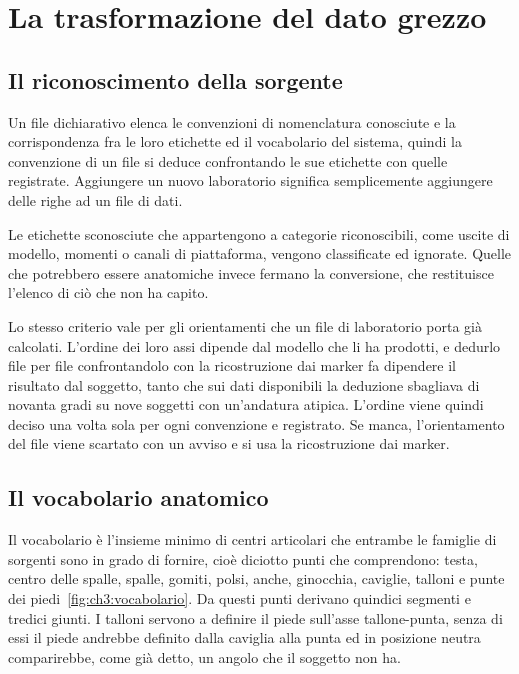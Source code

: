 \section{La trasformazione del dato grezzo}
\label{sec:ch3:trasformazione}

\subsection{Il riconoscimento della sorgente}
\label{subsec:ch3:riconoscimento}

Un file dichiarativo elenca le convenzioni di nomenclatura conosciute e la
corrispondenza fra le loro etichette ed il vocabolario del sistema, quindi la
convenzione di un file si deduce confrontando le sue etichette con quelle
registrate. Aggiungere un nuovo laboratorio significa semplicemente aggiungere
delle righe ad un file di dati.

Le etichette sconosciute che appartengono a categorie riconoscibili, come uscite
di modello, momenti o canali di piattaforma, vengono classificate ed ignorate.
Quelle che potrebbero essere anatomiche invece fermano la conversione, che
restituisce l'elenco di ciò che non ha capito.

Lo stesso criterio vale per gli orientamenti che un file di laboratorio porta già
calcolati. L'ordine dei loro assi dipende dal modello che li ha prodotti, e
dedurlo file per file confrontandolo con la ricostruzione dai marker fa dipendere
il risultato dal soggetto, tanto che sui dati disponibili la deduzione sbagliava
di novanta gradi su nove soggetti con un'andatura atipica. L'ordine viene quindi
deciso una volta sola per ogni convenzione e registrato. Se manca, l'orientamento
del file viene scartato con un avviso e si usa la ricostruzione dai marker.

\subsection{Il vocabolario anatomico}
\label{subsec:ch3:vocabolario}

Il vocabolario è l'insieme minimo di centri articolari che entrambe le famiglie
di sorgenti sono in grado di fornire, cioè diciotto punti che comprendono: testa,
centro delle spalle, spalle, gomiti, polsi, anche, ginocchia, caviglie, talloni e
punte dei piedi~\ref{fig:ch3:vocabolario}. Da questi punti
derivano quindici segmenti e tredici giunti. I talloni servono a definire il
piede sull'asse tallone-punta, senza di essi il piede andrebbe definito dalla
caviglia alla punta ed in posizione neutra comparirebbe, come già detto, un angolo che il soggetto
non ha.

